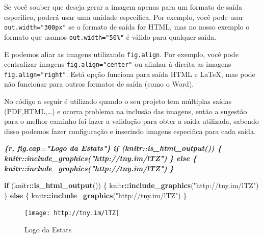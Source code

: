 \documentclass[
]{book}
\newenvironment{Shaded}{\begin{snugshade}}{\end{snugshade}}
\newcommand{\ControlFlowTok}[1]{\textcolor[rgb]{0.13,0.29,0.53}{\textbf{#1}}}
\newcommand{\InformationTok}[1]{\textcolor[rgb]{0.56,0.35,0.01}{\textbf{\textit{#1}}}}
\newcommand{\KeywordTok}[1]{\textcolor[rgb]{0.13,0.29,0.53}{\textbf{#1}}}
\newcommand{\NormalTok}[1]{#1}
\newcommand{\OperatorTok}[1]{\textcolor[rgb]{0.81,0.36,0.00}{\textbf{#1}}}
\newcommand{\StringTok}[1]{\textcolor[rgb]{0.31,0.60,0.02}{#1}}
\begin{document}
Se você souber que deseja gerar a imagem apenas para um formato de saída específico, poderá usar uma unidade específica. Por exemplo, você pode usar \texttt{out.width="300px"} se o formato de saída for HTML, mas no nosso exemplo o formato que usamos \texttt{out.width="50\%"} é válido para qualquer saída.

E podemos aliar as imagens utilizando \texttt{fig.align}. Por exemplo, você pode centralizar imagens \texttt{fig.align="center"} ou alinhar à direita as imagens \texttt{fig.align="right\textquotesingle{}"}. Está opção funciona para saída HTML e LaTeX, mas pode não funcionar para outros formatos de saída (como o Word).

No código a seguir é utilizado quando o seu projeto tem múltiplas saídas (PDF,HTML,\ldots) e ocorra problema na inclusão das imagens, então a sugestão para o melhor caminho foi fazer a validação para obter a saída utilizada, sabendo disso podemos fazer configuração e inserindo imagens especifica para cada saída.

\begin{Shaded}
\begin{Highlighting}[]
\InformationTok{\textasciigrave{}\textasciigrave{}\textasciigrave{}\{r, fig.cap="Logo da Estats"\}}
\InformationTok{if (knitr::is\_html\_output()) \{}
\InformationTok{    knitr::include\_graphics("http://tny.im/lTZ")}
\InformationTok{\} else \{}
\InformationTok{    knitr::include\_graphics("http://tny.im/lTZ")}
\InformationTok{\}}
\InformationTok{\textasciigrave{}\textasciigrave{}\textasciigrave{}}
\end{Highlighting}
\end{Shaded}

\begin{Shaded}
\begin{Highlighting}[]
\ControlFlowTok{if}\NormalTok{ (knitr}\OperatorTok{::}\KeywordTok{is\_html\_output}\NormalTok{()) \{}
\NormalTok{    knitr}\OperatorTok{::}\KeywordTok{include\_graphics}\NormalTok{(}\StringTok{"http://tny.im/lTZ"}\NormalTok{)}
\NormalTok{\} }\ControlFlowTok{else}\NormalTok{ \{}
\NormalTok{    knitr}\OperatorTok{::}\KeywordTok{include\_graphics}\NormalTok{(}\StringTok{"http://tny.im/lTZ"}\NormalTok{)}
\NormalTok{\}}
\end{Highlighting}
\end{Shaded}

\begin{figure}

{\centering \texttt{[image: http://tny.im/lTZ]} 

}

\caption{Logo da Estats}\label{fig:unnamed-chunk-3}
\end{figure}
\end{document}
